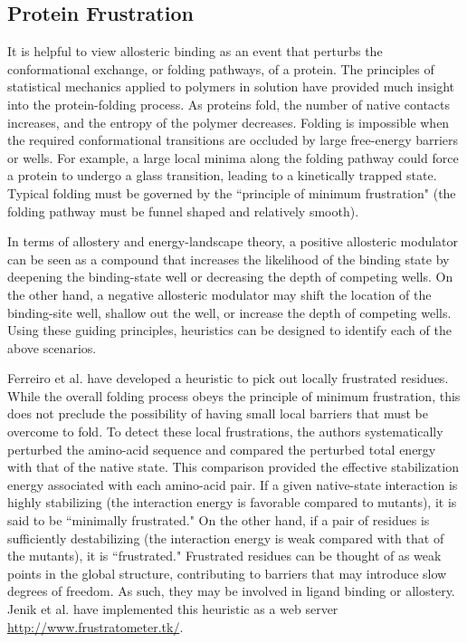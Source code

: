 \subsection{Protein Frustration}
\par It is helpful to view allosteric binding as an event that perturbs the conformational exchange, or folding pathways, of a protein. The principles of statistical mechanics applied to polymers in solution have provided much insight into the protein-folding process. As proteins fold, the number of native contacts increases, and the entropy of the polymer decreases. Folding is impossible when the required conformational transitions are occluded by large free-energy barriers or wells. For example, a large local minima along the folding pathway could force a protein to undergo a glass transition, leading to a kinetically trapped state. Typical folding must be governed by the ``principle of minimum frustration" (\ie the folding pathway must be funnel shaped and relatively smooth). \cite{Bryngelson1987,Wolynes1995,Onuchic1996,Onuchic1997b,Wolynes2005,Karplus2011}
\par In terms of allostery and energy-landscape theory, a positive allosteric modulator can be seen as a compound that increases the likelihood of the binding state by deepening the binding-state well or decreasing the depth of competing wells. On the other hand, a negative allosteric modulator may shift the location of the binding-site well, shallow out the well, or increase the depth of competing wells. Using these guiding principles, heuristics can be designed to identify each of the above scenarios.
\par Ferreiro et al. have developed a heuristic to pick out locally frustrated residues.\cite{Ferreiro2007a,Ferreiro2011a} While the overall folding process obeys the principle of minimum frustration, this does not preclude the possibility of having small local barriers that must be overcome to fold. To detect these local frustrations, the authors systematically perturbed the amino-acid sequence and compared the perturbed total energy with that of the native state. This comparison provided the effective stabilization energy associated with each amino-acid pair. If a given native-state interaction is highly stabilizing (\ie the interaction energy is favorable compared to mutants), it is said to be ``minimally frustrated." On the other hand, if a pair of residues is sufficiently destabilizing (\ie the interaction energy is weak compared with that of the mutants), it is ``frustrated." Frustrated residues can be thought of as weak points in the global structure, contributing to barriers that may introduce slow degrees of freedom. As such, they may be involved in ligand binding or allostery. Jenik et al. have implemented this heuristic as a web server \url{http://www.frustratometer.tk/}.\cite{Jenik2012}
